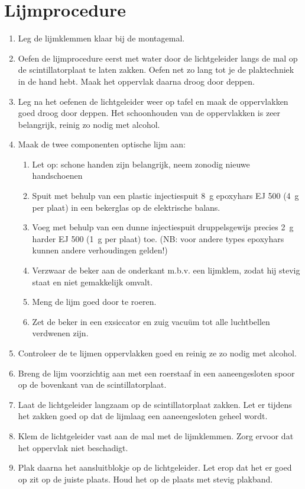 \section{Lijmprocedure}

\begin{enumerate}
    \item Leg de lijmklemmen klaar bij de montagemal.
    \item Oefen de lijmprocedure eerst met water door de lichtgeleider
    langs de mal op de scintillatorplaat te laten zakken. Oefen net zo
    lang tot je de plaktechniek in de hand hebt. Maak het oppervlak
    daarna droog door deppen.
    \item Leg na het oefenen de lichtgeleider weer op tafel en maak de
    oppervlakken goed droog door deppen. Het schoonhouden van de
    oppervlakken is zeer belangrijk, reinig zo nodig met alcohol.
    \item Maak de twee componenten optische lijm aan:
    \begin{enumerate}
        \item Let op: schone handen zijn belangrijk, neem zonodig nieuwe
        handschoenen
        \item Spuit met behulp van een plastic injectiespuit
        \SI{8}{\gram} epoxyhars EJ 500 (\SI{4}{\gram} per plaat) in een
        bekerglas op de elektrische balans.
        \item Voeg met behulp van een dunne injectiespuit druppelsgewijs
        precies \SI{2}{\gram} harder EJ 500 (\SI{1}{\gram} per plaat)
        toe. (NB: voor andere types epoxyhars kunnen andere verhoudingen
        gelden!)
        \item Verzwaar de beker aan de onderkant m.b.v. een lijmklem,
        zodat hij stevig staat en niet gemakkelijk omvalt.
        \item Meng de lijm goed door te roeren.
        \item Zet de beker in een exsiccator en zuig vacuüm tot alle
        luchtbellen verdwenen zijn.
    \end{enumerate}
    \item Controleer de te lijmen oppervlakken goed en reinig ze zo
    nodig met alcohol.
    \item Breng de lijm voorzichtig aan met een roerstaaf in een
    aaneengesloten spoor op de bovenkant van de scintillatorplaat.
    \item Laat de lichtgeleider langzaam op de scintillatorplaat zakken.
    Let er tijdens het zakken goed op dat de lijmlaag een aaneengesloten
    geheel wordt.
    \item Klem de lichtgeleider vast aan de mal met de lijmklemmen. Zorg
    ervoor dat het oppervlak niet beschadigt.
    \item Plak daarna het aansluitblokje op de lichtgeleider. Let erop
    dat het er goed op zit op de juiste plaats. Houd het op de plaats
    met stevig plakband.
\end{enumerate}

